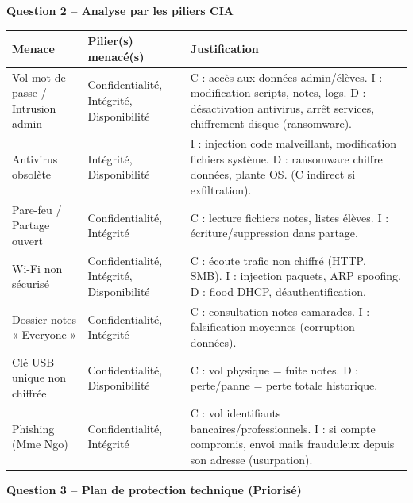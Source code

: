 \documentclass[11pt]{article}
\newcommand{\cle}[1]{{\popxbold\color{popdark}#1}}
\begin{document}
\begin{exoresolu}
\textbf{Question 2 -- Analyse par les piliers CIA}

\begin{center}
\begin{tabularx}{\linewidth}{|l|X|X|}
\hline
\rowcolor{popblueL}
\textbf{Menace} & \textbf{Pilier(s) menacé(s)} & \textbf{Justification} \\
\hline
Vol mot de passe / Intrusion admin & \cle{Confidentialité}, \cle{Intégrité}, \cle{Disponibilité} & \cle{C} : accès aux données admin/élèves. \cle{I} : modification scripts, notes, logs. \cle{D} : désactivation antivirus, arrêt services, chiffrement disque (ransomware). \\
\hline
Antivirus obsolète & \cle{Intégrité}, \cle{Disponibilité} & \cle{I} : injection code malveillant, modification fichiers système. \cle{D} : ransomware chiffre données, plante OS. (\cle{C} indirect si exfiltration). \\
\hline
Pare-feu / Partage ouvert & \cle{Confidentialité}, \cle{Intégrité} & \cle{C} : lecture fichiers notes, listes élèves. \cle{I} : écriture/suppression dans partage. \\
\hline
Wi-Fi non sécurisé & \cle{Confidentialité}, \cle{Intégrité}, \cle{Disponibilité} & \cle{C} : écoute trafic non chiffré (HTTP, SMB). \cle{I} : injection paquets, ARP spoofing. \cle{D} : flood DHCP, déauthentification. \\
\hline
Dossier notes « Everyone » & \cle{Confidentialité}, \cle{Intégrité} & \cle{C} : consultation notes camarades. \cle{I} : falsification moyennes (corruption données). \\
\hline
Clé USB unique non chiffrée & \cle{Confidentialité}, \cle{Disponibilité} & \cle{C} : vol physique = fuite notes. \cle{D} : perte/panne = perte totale historique. \\
\hline
Phishing (Mme Ngo) & \cle{Confidentialité}, \cle{Intégrité} & \cle{C} : vol identifiants bancaires/professionnels. \cle{I} : si compte compromis, envoi mails frauduleux depuis son adresse (usurpation). \\
\hline
\end{tabularx}
\end{center}

\textbf{Question 3 -- Plan de protection technique (Priorisé)}


\end{exoresolu}
\end{document}
